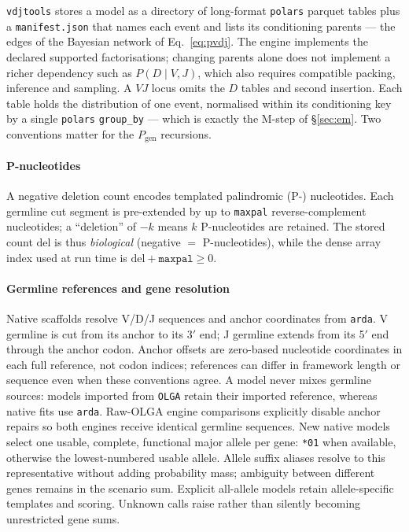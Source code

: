 \documentclass[11pt]{article}
\theoremstyle{oldplain}
\theoremstyle{oldrem}
\newcommand{\Pgen}{P_{\mathrm{gen}}}
\newcommand{\del}{\mathrm{del}}
\begin{document}
\texttt{vdjtools} stores a model as a directory of long-format \texttt{polars} parquet tables plus a
\texttt{manifest.json} that names each event and lists its conditioning parents --- the edges of the
Bayesian network of Eq.~\eqref{eq:pvdj}. The engine implements the declared supported
factorisations; changing parents alone does not implement a richer dependency
such as $P(D\mid V,J)$, which also requires compatible packing, inference and
sampling. A $VJ$ locus omits the $D$ tables and second insertion. Each table holds the
distribution of one event, normalised within its conditioning key by a single \texttt{polars}
\texttt{group\_by} --- which is exactly the M-step of \S\ref{sec:em}. Two conventions matter for the
$\Pgen$ recursions.

\paragraph{P-nucleotides} A negative deletion count encodes templated palindromic (P-)
nucleotides. Each germline cut segment is pre-extended by up to \texttt{maxpal} reverse-complement
nucleotides; a ``deletion'' of $-k$ means $k$ P-nucleotides are retained. The stored count $\del$ is thus
\emph{biological} (negative $=$ P-nucleotides), while the dense array index used at run time is
$\del+\texttt{maxpal}\ge 0$.

\paragraph{Germline references and gene resolution} Native scaffolds resolve V/D/J
sequences and anchor coordinates from \texttt{arda}.
V germline is cut from its anchor to its 3$'$ end; J germline extends from its
5$'$ end through the anchor codon.
Anchor offsets are zero-based nucleotide coordinates in each full reference, not
codon indices; references can differ in framework length or sequence even when
these conventions agree.
A model never mixes germline sources: models imported from \texttt{OLGA} retain
their imported reference, whereas native fits use \texttt{arda}.
Raw-OLGA engine comparisons explicitly disable anchor repairs so both engines
receive identical germline sequences.
New native models select one usable, complete, functional major allele per gene:
\texttt{*01} when available, otherwise the lowest-numbered usable allele.
Allele suffix aliases resolve to this representative without adding probability
mass; ambiguity between different genes remains in the scenario sum.
Explicit all-allele models retain allele-specific templates and scoring.
Unknown calls raise rather than silently becoming unrestricted gene sums.
\end{document}
